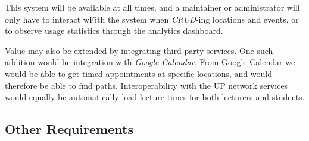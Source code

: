 \documentclass[10pt,a4paper]{article}
\begin{document}
			This system will be available at all times, and a maintainer or
			administrator will only have to interact wFith the system when
			\textsl{CRUD}-ing locations and events, or to observe usage statistics
			through the analytics dashboard.

			\medskip

			Value may also be extended by integrating third-party services. One such
			addition would be integration with \textsl{Google Calendar}. From Google
			Calendar we would be able to get timed appointments at specific locations,
			and would therefore be able to find paths. Interoperability with the UP
			network services would equally be automatically load lecture times for
			both lecturers and students.

		\subsection{Other Requirements}
\end{document}
